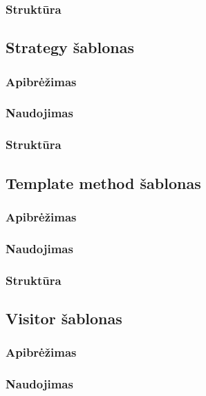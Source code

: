 \documentclass[10pt]{IEEEtran}
\begin{document}
			\subsubsection{Struktūra}


		\subsection{Strategy šablonas}

			\subsubsection{Apibrėžimas}

			\subsubsection{Naudojimas}

			\subsubsection{Struktūra}

		
		\subsection{Template method šablonas}

			\subsubsection{Apibrėžimas}

			\subsubsection{Naudojimas}

			\subsubsection{Struktūra}

		\subsection{Visitor šablonas}

			\subsubsection{Apibrėžimas}

			\subsubsection{Naudojimas}
\end{document}
